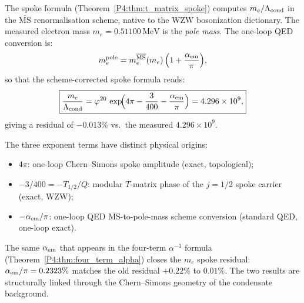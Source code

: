 \begin{theorem}
\label{P4:thm:msbar_pole}
The spoke formula (Theorem~\ref{P4:thm:t_matrix_spoke}) computes
$m_e/\Lambda_{\mathrm{cond}}$ in the $\overline{\mathrm{MS}}$ renormalisation scheme,
native to the WZW bosonization dictionary.
The measured electron mass $m_e = 0.51100\,\mathrm{MeV}$ is the
\emph{pole mass}. The one-loop QED conversion is:
\begin{equation}
  m_e^{\mathrm{pole}} = m_e^{\overline{\mathrm{MS}}}(m_e)\,
  \Bigl(1 + \frac{\alpha_{\mathrm{em}}}{\pi}\Bigr),
  \label{P4:eq:pole_msbar}
\end{equation}
so that the scheme-corrected spoke formula reads:
\begin{equation}
  \boxed{
  \frac{m_e}{\Lambda_{\mathrm{cond}}} = \varphi^{20}\,\exp\!\Bigl(
    4\pi - \frac{3}{400} - \frac{\alpha_{\mathrm{em}}}{\pi}\Bigr)
  = 4.296\times10^9,
  }
  \label{P4:eq:spoke_pole_corrected}
\end{equation}
giving a residual of $-0.013\%$ vs.\ the measured $4.296\times10^9$.

The three exponent terms have distinct physical origins:
\begin{itemize}[noitemsep]
  \item $4\pi$: one-loop Chern--Simons spoke amplitude (exact, topological);
  \item $-3/400 = -T_{1/2}/Q$: modular $T$-matrix phase of the
    $j=1/2$ spoke carrier (exact, WZW);
  \item $-\alpha_{\mathrm{em}}/\pi$: one-loop QED $\overline{\mathrm{MS}}$-to-pole-mass
    scheme conversion (standard QED, one-loop exact).
\end{itemize}
The same $\alpha_{\mathrm{em}}$ that appears in the four-term $\alpha^{-1}$ formula
(Theorem~\ref{P4:thm:four_term_alpha}) closes the $m_e$ spoke residual:
$\alpha_{\mathrm{em}}/\pi = 0.2323\%$ matches the old residual $+0.22\%$ to $0.01\%$.
The two results are structurally linked through the Chern--Simons
geometry of the condensate background.
\end{theorem}

